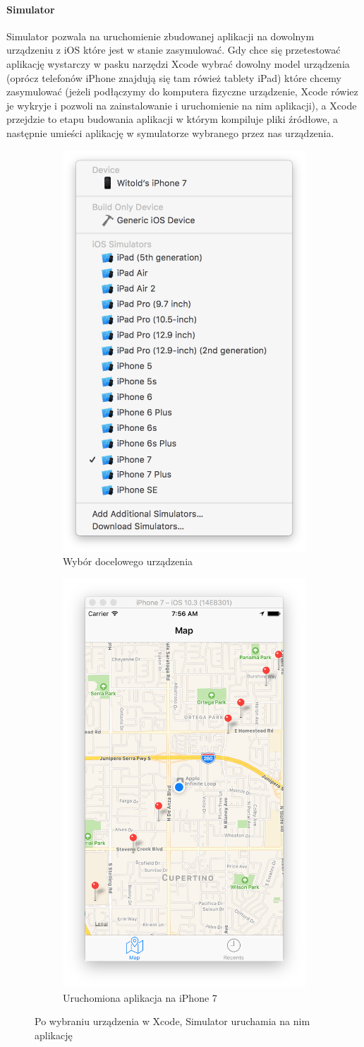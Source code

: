 \paragraph{Simulator}
Simulator pozwala na uruchomienie zbudowanej aplikacji na dowolnym urządzeniu z iOS które jest w stanie zasymulować. Gdy chce się
przetestować aplikację wystarczy w pasku narzędzi Xcode wybrać dowolny model urządzenia (oprócz telefonów iPhone znajdują się tam
rówież tablety iPad) które chcemy zasymulować (jeżeli podłączymy do komputera fizyczne urządzenie, Xcode rówiez je wykryje i pozwoli
na zainstalowanie i uruchomienie na nim aplikacji), a Xcode przejdzie to etapu budowania aplikacji w którym kompiluje pliki źródłowe,
a następnie umieści aplikację w symulatorze wybranego przez nas urządzenia.
\begin{figure}[ht!]
\centering
\begin{subfigure}{.5\textwidth}
  \centering
  \includegraphics[width=.4\linewidth]{images/chapter-2-image-3-target.png}
  \caption{Wybór docelowego urządzenia}
  \label{fig:sub1}
\end{subfigure}%
\begin{subfigure}{.5\textwidth}
  \centering
  \includegraphics[width=.4\linewidth]{images/chapter-2-image-4-simulator.png}
  \caption{Uruchomiona aplikacja na iPhone 7}
  \label{fig:sub2}
\end{subfigure}
\caption{Po wybraniu urządzenia w Xcode, Simulator uruchamia na nim aplikację}
\label{fig:test}
\end{figure}

